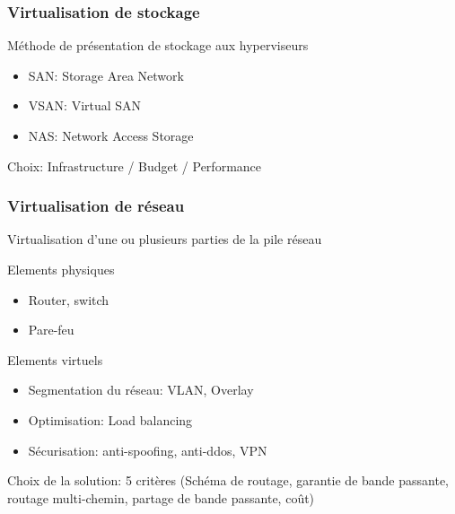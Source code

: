 \documentclass{beamer}
\begin{document}
\begin{frame}
\frametitle{Virtualisation de stockage}

Méthode de présentation de stockage aux hyperviseurs

\begin{itemize}
    \item SAN: Storage Area Network
    \item VSAN: Virtual SAN
    \item NAS: Network Access Storage
\end{itemize}

Choix: Infrastructure / Budget / Performance









\end{frame}


\begin{frame}
\frametitle{Virtualisation de réseau}

Virtualisation d'une ou plusieurs parties de la pile réseau

Elements physiques
\begin{itemize}
    \item Router, switch
    \item Pare-feu
\end{itemize}
Elements virtuels
\begin{itemize}
    \item Segmentation du réseau: VLAN, Overlay
    \item Optimisation: Load balancing
    \item Sécurisation: anti-spoofing, anti-ddos, VPN
\end{itemize}

Choix de la solution: 5 critères (Schéma de routage, garantie de bande passante, routage multi-chemin, partage de bande passante, coût)

\end{frame}
\end{document}
